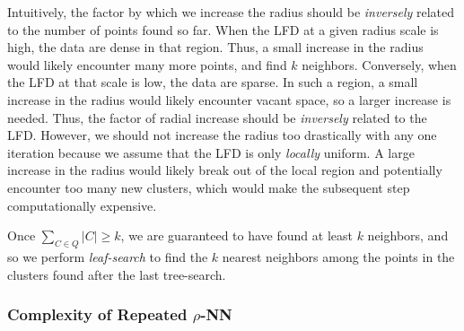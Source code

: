 Intuitively, the factor by which we increase the radius should be \textit{inversely} related to the number of points found so far.
When the LFD at a given radius scale is high, the data are dense in that region.
Thus, a small increase in the radius would likely encounter many more points, and find $k$ neighbors.
Conversely, when the LFD at that scale is low, the data are sparse.
In such a region, a small increase in the radius would likely encounter vacant space, so a larger increase is needed.
Thus, the factor of radial increase should be \textit{inversely} related to the LFD.
However, we should not increase the radius too drastically with any one iteration because we assume that the LFD is only \textit{locally} uniform.
A large increase in the radius would likely break out of the local region and potentially encounter too many new clusters, which would make the subsequent step computationally expensive.

Once $\sum_{C \in Q} |C| \geq k$, we are guaranteed to have found at least $k$ neighbors, and so we perform \textit{leaf-search} to find the $k$ nearest neighbors among the points in the clusters found after the last tree-search.


\subsubsection{Complexity of Repeated \texorpdfstring{$\rho$}{p}-NN}
\label{sec:methods:knn-search:repeated-rnn-complexity}


